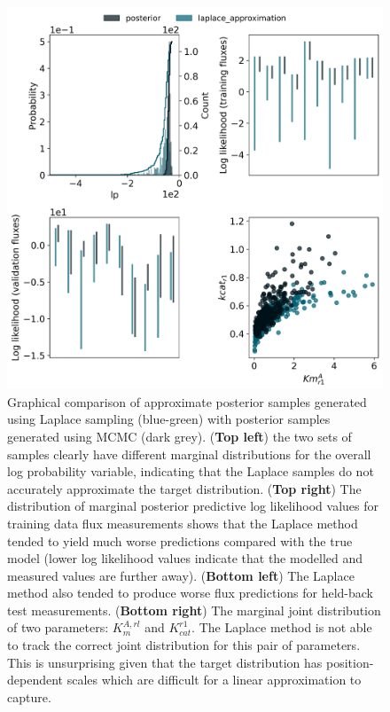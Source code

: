 \documentclass[journal=asbcd6,manuscript=article,layout=traditional]{achemso}
\begin{document}
\begin{figure}

\begin{minipage}{\linewidth}

\includegraphics{./figures/laplace.png}

\end{minipage}%

\caption{\label{fig-laplace}Graphical comparison of approximate
posterior samples generated using Laplace sampling (blue-green) with
posterior samples generated using MCMC (dark grey). (\textbf{Top left})
the two sets of samples clearly have different marginal distributions
for the overall log probability variable, indicating that the Laplace
samples do not accurately approximate the target distribution.
(\textbf{Top right}) The distribution of marginal posterior predictive
log likelihood values for training data flux measurements shows that the
Laplace method tended to yield much worse predictions compared with the
true model (lower log likelihood values indicate that the modelled and
measured values are further away). (\textbf{Bottom left}) The Laplace
method also tended to produce worse flux predictions for held-back test
measurements. (\textbf{Bottom right}) The marginal joint distribution of
two parameters: \(K_m^{A,rl}\) and \(K_{cat}^{r1}\). The Laplace method
is not able to track the correct joint distribution for this pair of
parameters. This is unsurprising given that the target distribution has
position-dependent scales which are difficult for a linear approximation
to capture.}

\end{figure}%
\end{document}
